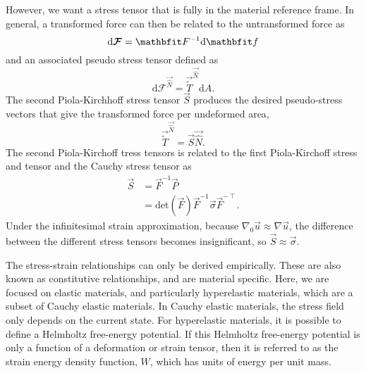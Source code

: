 However, we want a stress tensor that is fully in the material reference frame.
In general, a transformed force can then be related to the untransformed force as
\begin{equation}
    \mathrm{d} \boldsymbol{\mathcal{F}} = \vec{F}^{-1} \textrm{d} \vec{f}\\
\end{equation}
and an associated pseudo stress tensor defined as
\begin{equation}
    \mathrm{d} \boldsymbol{\mathcal{F}}^{\vec{\hat{N}}} = \vec{\widetilde{T}}^{\vec{\hat{N}}} \textrm{d} A.
\end{equation}
The second Piola-Kirchhoff stress tensor $\vec{S}$ produces the desired pseudo-stress vectors that give the transformed force per undeformed area,
\begin{equation}
    \vec{\widetilde{T}}^{\vec{\hat{N}}} = \vec{S} \vec{\hat{N}}.
\end{equation}
The second Piola-Kirchoff tress tensors is related to the first Piola-Kirchoff stress and tensor and the Cauchy stress tensor as
\begin{align}
    \vec{S} &= \vec{F}^{-1} \vec{P} \nonumber\\
            &= \textrm{det}( \vec{F} ) \vec{F}^{-1} \vec{\sigma} \vec{F}^{-\intercal}.
\end{align}
Under the infinitesimal strain approximation, because $\nabla_{0} \vec{u} \approx \nabla \vec{u}$, the difference between the different stress tensors becomes insignificant, so $\vec{S} \approx \vec{\sigma}$.

The stress-strain relationships can only be derived empirically.
These are also known as constitutive relationships, and are material specific.
Here, we are focused on elastic materials, and particularly hyperelastic materials, which are a subset of Cauchy elastic materials.
In Cauchy elastic materials, the stress field only depends on the current state.
For hyperelastic materials, it is possible to define a Helmholtz free-energy potential.
If this Helmholtz free-energy potential is only a function of a deformation or strain tensor, then it is referred to as the strain energy density function, $W$, which has units of energy per unit mass.

